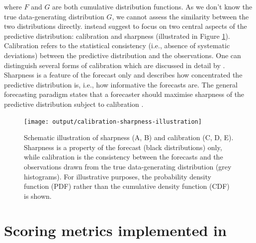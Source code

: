 \documentclass[
]{jss}
\begin{document}
where \(F\) and \(G\) are both cumulative distribution functions. As we
don't know the true data-generating distribution \(G\), we cannot assess
the similarity between the two distributions directly.
\cite{gneitingProbabilisticForecastsCalibration2007} instead suggest to
focus on two central aspects of the predictive distribution: calibration
and sharpness (illustrated in Figure \ref{fig:forecast-paradigm}).
Calibration refers to the statistical consistency (i.e., absence of
systematic deviations) between the predictive distribution and the
observations. One can distinguish several forms of calibration which are
discussed in detail by
\cite{gneitingProbabilisticForecastsCalibration2007}. Sharpness is a
feature of the forecast only and describes how concentrated the
predictive distribution is, i.e., how informative the forecasts are. The
general forecasting paradigm states that a forecaster should maximise
sharpness of the predictive distribution subject to calibration
\citep{gneitingProbabilisticForecastsCalibration2007}.

\begin{CodeChunk}
\begin{figure}

{\centering \texttt{[image: output/calibration-sharpness-illustration]}

}

\caption[Schematic illustration of sharpness (A, B) and calibration (C, D, E)]{Schematic illustration of sharpness (A, B) and calibration (C, D, E). Sharpness is a property of the forecast (black distributions) only, while calibration is the consistency between the forecasts and the observations drawn from the true data-generating distribution (grey histograms). For illustrative purposes, the probability density function (PDF) rather than the cumulative density function (CDF) is shown.}\label{fig:forecast-paradigm}
\end{figure}
\end{CodeChunk}

\section[Scoring metrics implemented in scoringutils]{Scoring metrics
implemented in }\label{metrics}
\end{document}
